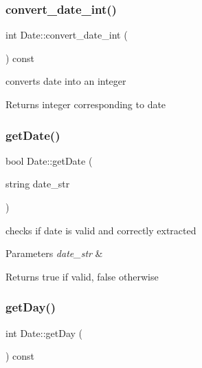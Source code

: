 \subsubsection{\texorpdfstring{convert\+\_\+date\+\_\+int()}{convert\_date\_int()}}
{\footnotesize\ttfamily int Date\+::convert\+\_\+date\+\_\+int (\begin{DoxyParamCaption}{ }\end{DoxyParamCaption}) const}



converts date into an integer 

\begin{DoxyReturn}{Returns}
integer corresponding to date 
\end{DoxyReturn}
\hypertarget{class_date_a5693be8bccd3d4bd431a2cb0ae042d02}{}\label{class_date_a5693be8bccd3d4bd431a2cb0ae042d02} 
\subsubsection{\texorpdfstring{get\+Date()}{getDate()}}
{\footnotesize\ttfamily bool Date\+::get\+Date (\begin{DoxyParamCaption}\item[{string}]{date\+\_\+str }\end{DoxyParamCaption})}



checks if date is valid and correctly extracted 


\begin{DoxyParams}{Parameters}
{\em date\+\_\+str} & \\
\hline
\end{DoxyParams}
\begin{DoxyReturn}{Returns}
true if valid, false otherwise 
\end{DoxyReturn}
\hypertarget{class_date_a0f253815240e70f4c39cb93cc68bd3f4}{}\label{class_date_a0f253815240e70f4c39cb93cc68bd3f4} 
\subsubsection{\texorpdfstring{get\+Day()}{getDay()}}
{\footnotesize\ttfamily int Date\+::get\+Day (\begin{DoxyParamCaption}{ }\end{DoxyParamCaption}) const}



